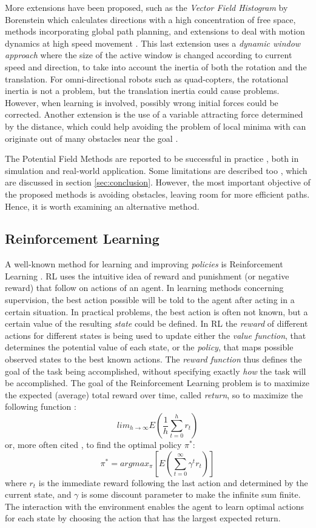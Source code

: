 \documentclass[11pt]{article}
\begin{document}
More extensions have been proposed, such as the \emph{Vector Field Histogram} by Borenstein which calculates directions with a high concentration of free space, methods incorporating global path planning, and extensions to deal with motion dynamics at high speed movement \cite{burgard97}. This last extension uses a \emph{dynamic window approach} where the size of the active window is changed according to current speed and direction, to take into account the inertia of both the rotation and the translation. For omni-directional robots such as quad-copters, the rotational inertia is not a problem, but the translation inertia could cause problems. However, when learning is involved, possibly wrong initial forces could be corrected. Another extension is the use of a variable attracting force determined by the distance, which could help avoiding the problem of local minima with can originate out of many obstacles near the goal \cite{ge00}.

The Potential Field Methods are reported to be successful in practice \cite{brooks86, koren91, burgard99}, both in simulation and real-world application. Some limitations are described too \cite{koren91}, which are discussed in section \ref{sec:conclusion}. However, the most important objective of the proposed methods is avoiding obstacles, leaving room for more efficient paths. Hence, it is worth examining an alternative method.


\subsection{Reinforcement Learning}
A well-known method for learning and improving \emph{policies} is Reinforcement Learning \cite[p.51-82]{sutton98}. RL uses the intuitive idea of reward and punishment (or negative reward) that follow on actions of an agent. In learning methods concerning supervision, the best action possible will be told to the agent after acting in a certain situation. In practical problems, the best action is often not known, but a certain value of the resulting \emph{state} could be defined. In RL the \emph{reward} of different actions for different states is being used to update either the \emph{value function}, that determines the potential value of each state, or the \emph{policy}, that maps possible observed states to the best known actions. The \emph{reward function} thus defines the goal of the task being accomplished, without specifying exactly \emph{how} the task will be accomplished. The goal of the Reinforcement Learning problem is to maximize the expected (average) total reward over time, called \emph{return}, so to maximize the following function \cite{kaebling96}:
 \[ lim_{h \rightarrow \infty} E( \frac1h \sum_{t=0}^h r_t ) \]
or, more often cited \cite{li-juan08}, to find the optimal policy $\pi^*$:
 \[ \pi^* = argmax_{\pi} [ E( \sum_{t=0}^{\infty} \gamma^{t} r_t ) ] \]
where $r_t$ is the immediate reward following the last action and determined by the current state, and $\gamma$ is some discount parameter to make the infinite sum finite. The interaction with the environment enables the agent to learn optimal actions for each state by choosing the action that has the largest expected return.
\end{document}

